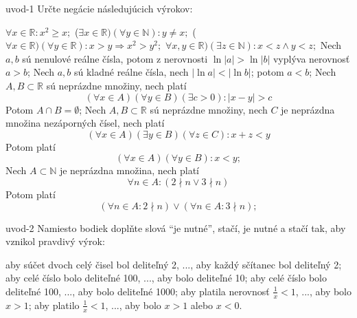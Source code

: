 \begin{defproblem}{uvod-1}
Určte negácie následujúcich výrokov:
\begin{tasks}
  \task $\forall x \in \mathbb{R} : x^2 \geq x;$
  \task ($\exists x \in \mathbb{R})(\forall y \in \mathbb{N}): y \neq x;$
  \task ($\forall x \in \mathbb{R})(\forall y \in \mathbb{R}):
        x > y \Rightarrow x^2 > y^2;$
  \task $\forall x, y \in \mathbb{R})(\exists z \in \mathbb{N}): x < z \land
        y < z;$
  \task Nech $a, b$ sú nenulové reálne čísla, potom z nerovnosti
        $\ln|a| > \ln|b|$
        vyplýva nerovnosť $a > b$;
  \task Nech $a, b$ sú kladné reálne čísla, nech $|\ln a| < |\ln b|$; potom
        $a < b$;
  \task Nech $A, B \subset \mathbb{R}$ sú neprázdne množiny, nech platí
        $$(\forall x \in A)(\forall y \in B)(\exists c > 0): |x - y| > c$$
        Potom $A \cap B = \emptyset$;
  \task Nech $A, B \subset \mathbb{R}$ sú neprázdne množiny, nech $C$ je
        neprázdna množina nezáporných čísel, nech platí
        $$(\forall x \in A)(\exists y \in B)(\forall z \in C): x + z < y$$
        Potom platí
        $$(\forall x \in A)(\forall y \in B): x < y;$$
  \task Nech $A \subset \mathbb{N}$ je neprázdna množina, nech platí
        $$\forall n \in A: (2 \nmid n \lor 3 \nmid n)$$
        Potom platí
        $$(\forall n \in A: 2 \nmid n) \lor (\forall n \in A: 3 \nmid n);$$
\end{tasks}
\end{defproblem}

\begin{defproblem}{uvod-2}
Namiesto bodiek doplňte slová \enquote{je nutné}, stačí, je nutné a stačí tak,
aby vznikol pravdivý výrok:
\begin{tasks}
  \task aby súčet dvoch celý čisel bol deliteľný 2, ..., aby každý sčítanec bol deliteľný 2;
  \task aby celé číslo bolo deliteľné 100, ..., aby bolo deliteľné 10;
  \task aby celé číslo bolo deliteľné 100, ..., aby bolo deliteľné 1000;
  \task aby platila nerovnosť $\frac{1}{x} < 1$, ..., aby bolo $x > 1$;
  \task aby platilo $\frac{1}{x} < 1$, ..., aby bolo $x > 1$ alebo $x < 0$.
\end{tasks}
\end{defproblem}
